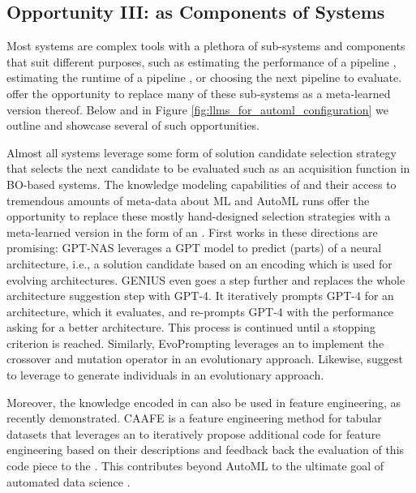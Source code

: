 \documentclass[10pt]{article} %
\begin{document}
\subsection{Opportunity III: \LLMs as Components of \AutoML Systems}
\label{subsec:llms-for-simulating-automl}

Most \AutoML systems are complex tools with a plethora of sub-systems and components that suit different purposes, such as estimating the performance of a pipeline \citep{white-neurips21a}, estimating the runtime of a pipeline \citep{mohr-tpami21a}, or choosing the next pipeline to evaluate. \LLMs offer the opportunity to replace many of these sub-systems as a meta-learned version thereof. Below and in Figure \ref{fig:llms_for_automl_configuration} we outline and showcase several of such opportunities.

Almost all \AutoML systems leverage some form of solution candidate selection strategy that selects the next candidate to be evaluated such as an acquisition function in BO-based systems. The knowledge modeling capabilities of \LLMs and their access to tremendous amounts of meta-data about ML and AutoML runs offer the opportunity to replace these mostly hand-designed selection strategies with a meta-learned version in the form of an \LLM. First works in these directions are promising: GPT-NAS \citep{yu2023gptnas} leverages a GPT model to predict (parts) of a neural architecture, i.e., a solution candidate based on an encoding which is used for evolving architectures. GENIUS \citep{zheng2023gpt4} even goes a step further and replaces the whole architecture suggestion step with GPT-4. It iteratively prompts GPT-4 for an architecture, which it evaluates, and re-prompts GPT-4 with the performance asking for a better architecture. This process is continued until a stopping criterion is reached. Similarly, EvoPrompting \citep{chen2023evoprompting} leverages an \LLM to implement the crossover and mutation operator in an evolutionary \NAS approach. Likewise, \citet{nasier-arxiv23a} suggest to leverage \LLMs to generate individuals in an evolutionary \NAS approach.

Moreover, the knowledge encoded in \LLMs can also be used in feature engineering, as recently demonstrated. CAAFE \citep{hollmann2023gpt} is a feature engineering method for tabular datasets that leverages an \LLM to iteratively propose additional code for feature engineering based on their descriptions and feedback back the evaluation of this code piece to the \LLMs. This contributes beyond AutoML to the ultimate goal of automated data science \citep{bie-cacm22a}.
\end{document}
